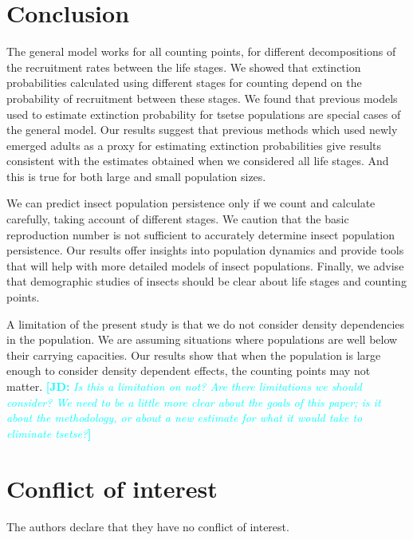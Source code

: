 \documentclass[smallextended]{svjour3}
\newcommand{\comment}[3]{\textcolor{#1}{\textbf{[#2: }\textit{#3}\textbf{]}}}
\newcommand{\jd}[1]{\comment{cyan}{JD}{#1}}
\begin{document}
\section{Conclusion}
\label{section9}
The general model works for all counting points, for different decompositions of the recruitment rates between the life stages. We showed that extinction probabilities calculated using different stages for counting depend on the probability of recruitment between these stages. We found that previous models used to estimate extinction probability for tsetse populations are special cases of the general model. Our results suggest that previous methods which used newly emerged adults as a proxy for estimating extinction probabilities give  results consistent with the estimates obtained when we considered all life stages. And this is true for both large and small population sizes.

We can predict insect population persistence only if we count and calculate carefully, taking account of different stages. We caution that the basic reproduction number is not sufficient to accurately determine insect population persistence. Our results offer insights into population dynamics and provide tools that will help with more detailed models of insect populations. Finally, we advise that demographic studies of insects should be clear about life stages and counting points.

A limitation of the present study is that we do not consider density dependencies in the population. We are assuming situations where populations are well below their carrying capacities. Our results show that when the population is large enough to consider density dependent effects, the counting points may not matter.
\jd{Is this a limitation on not? Are there limitations we should consider? We need to be a little more clear about the goals of this paper; is it about the methodology, or about a new estimate for what it would take to eliminate tsetse?}


%
 \section*{Conflict of interest}
%
 The authors declare that they have no conflict of interest.
\end{document}
